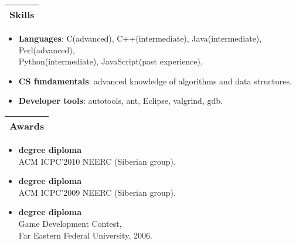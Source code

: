 \documentclass[a4paper]{article}
\begin{document}
\begin{multicols}{2}

	\raggedcolumns

	\begin{tabular}{@{}l}
		\textbf{\large Skills}\\
		\hline\hline
	\end{tabular}

		\begin{itemize}
			\item \textbf{Languages}: C(advanced), C++(intermediate), Java(intermediate), Perl(advanced),\\Python(intermediate), JavaScript(past experience).
			\item \textbf{CS fundamentals}: advanced knowledge of algorithms and data structures.
			\item \textbf{Developer tools}: autotools, ant, Eclipse, valgrind, gdb.
		\end{itemize}

	\columnbreak

	\begin{tabular}{@{}l}
		\textbf{\large Awards}\\
		\hline\hline
	\end{tabular}

	\begin{itemize}
		\item \textbf{ degree diploma}\\ACM ICPC'2010 NEERC (Siberian group).
		\item \textbf{ degree diploma}\\ACM ICPC'2009 NEERC (Siberian group).
		\item \textbf{ degree diploma}\\Game Development Contest,\\Far Eastern Federal University, 2006.
	\end{itemize}

\end{multicols}
\end{document}
